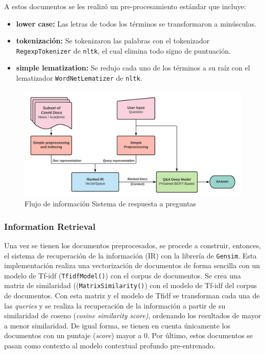 A estos documentos se les realizó un pre-procesamiento estándar que incluye:
\begin{itemize}
    \item \textbf{lower case:} Las letras de todos los términos se transformaron a minúsculas.
    
    \item \textbf{tokenización:} Se tokenizaron las palabras con el tokenizador \texttt{RegexpTokenizer} de \texttt{nltk}, el cual elimina todo signo de puntuación.
        
    \item \textbf{simple lematization:} Se redujo cada uno de los términos a su raíz con el lematizador \texttt{WordNetLematizer} de \texttt{nltk}.
\end{itemize}

\begin{figure}[H]
    \centering
    \includegraphics[width=\textwidth]{doc_final/images/QA_System_diag.png}
    \caption{Flujo de información Sistema de respuesta a preguntas}
    \label{fig:qa_diag}
\end{figure}

\subsubsection{Information Retrieval}

Una vez se tienen los documentos preprocesados, se procede a construir, entonces, el sistema de recuperación de la información (IR) con la librería de \texttt{Gensim}. Esta implementación realiza una vectorización de documentos de forma sencilla con un modelo de Tf-idf (\texttt{TfidfModel()}) con el corpus de documentos. Se crea una matriz de similaridad ((\texttt{MatrixSimilarity()}) con el modelo de Tf-idf del corpus de documentos. Con esta matriz y el modelo de Tfidf se transforman cada una de las \textit{queries} y se realiza la recuperación de la información a partir de su similaridad de coseno (\textit{cosine similarity score)}, ordenando los resultados de mayor a menor similaridad. De igual forma, se tienen en cuenta únicamente los documentos con un puntaje (\textit{score}) mayor a 0. Por último, estos documentos se pasan como contexto al modelo contextual profundo pre-entrenado. \\

